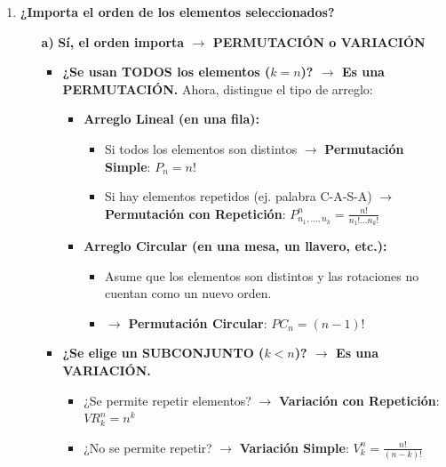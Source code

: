 \documentclass[12pt, letterpaper]{article}
\begin{document}
\begin{enumerate}[label=\bfseries, wide]
	\item \textbf{¿Importa el orden de los elementos seleccionados?}
	      \begin{itemize}
		      \item[\bfseries a)] \textbf{Sí, el orden importa $\rightarrow$ PERMUTACIÓN o VARIACIÓN}
		            \begin{itemize}
			            \item \textbf{¿Se usan TODOS los elementos ($k=n$)? $\rightarrow$ Es una PERMUTACIÓN.}
			                  \noindent Ahora, distingue el tipo de arreglo:
			                  \begin{itemize}
				                  \item \textbf{Arreglo Lineal (en una fila):}
				                        \begin{itemize}
					                        \item Si todos los elementos son distintos $\rightarrow$ \textbf{Permutación Simple}:
					                              $ P_n = n! $
					                        \item Si hay elementos repetidos (ej. palabra C-A-S-A) $\rightarrow$ \textbf{Permutación con Repetición}:
					                              $ P_{n_1, \dots, n_k}^n = \frac{n!}{n_1! \dots n_k!} $
				                        \end{itemize}

				                  \item \textbf{Arreglo Circular (en una mesa, un llavero, etc.):}
				                        \begin{itemize}
					                        \item Asume que los elementos son distintos y las rotaciones no cuentan como un nuevo orden.
					                        \item $\rightarrow$ \textbf{Permutación Circular}: $ PC_n = (n-1)! $
				                        \end{itemize}
			                  \end{itemize}

			            \item \textbf{¿Se elige un SUBCONJUNTO ($k<n$)? $\rightarrow$ Es una VARIACIÓN.}
			                  \begin{itemize}
				                  \item ¿Se permite repetir elementos? $\rightarrow$ \textbf{Variación con Repetición}: $ VR_k^n = n^k $
				                  \item ¿No se permite repetir? $\rightarrow$ \textbf{Variación Simple}: $ V_k^n = \frac{n!}{(n-k)!} $
			                  \end{itemize}
		            \end{itemize}


\end{itemize}
\end{enumerate}
\end{document}
